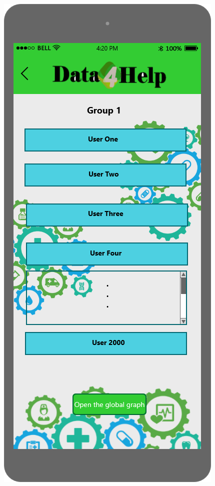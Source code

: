 \begin{figure}[h!]
	\centering
 	\begin{minipage}[b]{0.25\textwidth}
    		\includegraphics[width=\textwidth]{./pictures/group1.png}

\end{minipage}
\end{figure}
